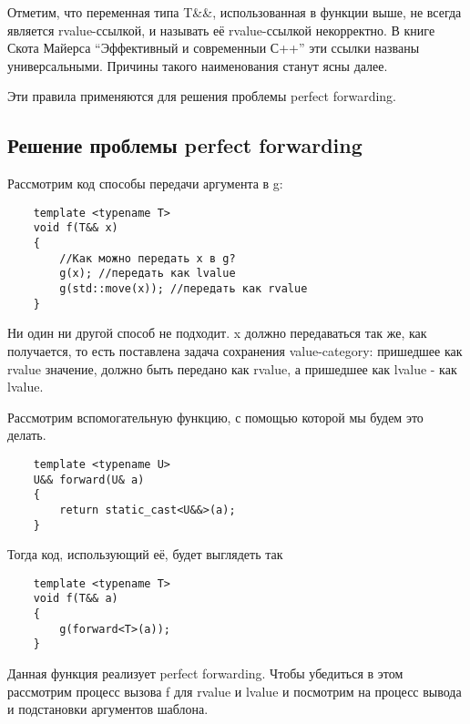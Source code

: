 \vspace{\baselineskip}

	Отметим, что переменная типа T\&\&, использованная в функции выше, не всегда является rvalue-ссылкой, и называть её rvalue-ссылкой некорректно. В книге Скота Майерса “Эффективный и современныи С++” эти ссылки названы универсальными. Причины такого наименования станут ясны далее.

	Эти правила применяются для решения проблемы perfect forwarding.

\subsection{Решение проблемы perfect forwarding}

	Рассмотрим код способы передачи аргумента в g:

	\begin{verbatim}
	template <typename T>
	void f(T&& x)
	{
	    //Как можно передать x в g?
	    g(x); //передать как lvalue
	    g(std::move(x)); //передать как rvalue
	}

	\end{verbatim}

	Ни один ни другой способ не подходит. x должно передаваться так же, как получается, то есть поставлена задача сохранения value-category: пришедшее как rvalue значение, должно быть передано как rvalue, а пришедшее как lvalue - как lvalue.

	Рассмотрим вспомогательную функцию, с помощью которой мы будем это делать.

	\begin{verbatim}
	template <typename U>
	U&& forward(U& a)
	{
	    return static_cast<U&&>(a);
	}
	\end{verbatim}

	Тогда код, использующий её, будет выглядеть так

	\begin{verbatim}
	template <typename T>
	void f(T&& a)
	{
	    g(forward<T>(a));
	}
	\end{verbatim}

	Данная функция реализует perfect forwarding. Чтобы убедиться в этом рассмотрим процесс вызова f для rvalue и lvalue и посмотрим на процесс вывода и подстановки аргументов шаблона.

